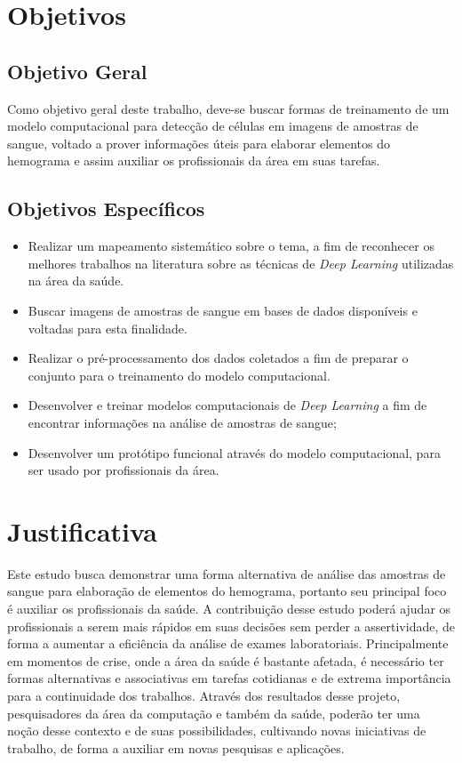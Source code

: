 \section{Objetivos}
\label{sec:objetivos}

\subsection{Objetivo Geral}
Como objetivo geral deste trabalho, deve-se buscar formas de treinamento de um modelo computacional para detecção de células em imagens de amostras de sangue, voltado a prover informações úteis para elaborar elementos do hemograma e assim auxiliar os profissionais da área em suas tarefas.

\subsection{Objetivos Específicos}
\begin{itemize}
    \item Realizar um mapeamento sistemático sobre o tema, a fim de reconhecer os melhores trabalhos na literatura sobre as técnicas de \emph{Deep Learning} utilizadas na área da saúde.
    \item Buscar imagens de amostras de sangue em bases de dados disponíveis e voltadas para esta finalidade.
    \item Realizar o pré-processamento dos dados coletados a fim de preparar o conjunto para o treinamento do modelo computacional.
    \item Desenvolver e treinar modelos computacionais de \emph{Deep Learning} a fim de encontrar informações na análise de amostras de sangue;
    \item Desenvolver um protótipo funcional através do modelo computacional, para ser usado por profissionais da área.
\end{itemize}

\section{Justificativa}
\label{sec:justificativa}
Este estudo busca demonstrar uma forma alternativa de análise das amostras de sangue para elaboração de elementos do hemograma, portanto seu principal foco é auxiliar os profissionais da saúde. A contribuição desse estudo poderá ajudar os profissionais a serem mais rápidos em suas decisões sem perder a assertividade, de forma a aumentar a eficiência da análise de exames laboratoriais. Principalmente em momentos de crise, onde a área da saúde é bastante afetada, é necessário ter formas alternativas e associativas em tarefas cotidianas e de extrema importância para a continuidade dos trabalhos. Através dos resultados desse projeto, pesquisadores da área da computação e também da saúde, poderão ter uma noção desse contexto e de suas possibilidades, cultivando novas iniciativas de trabalho, de forma a auxiliar em novas pesquisas e aplicações.

